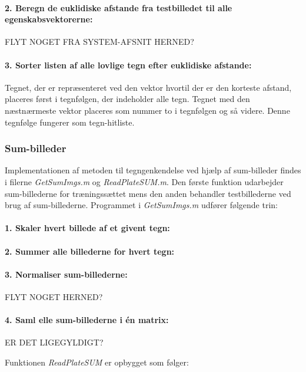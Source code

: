 \paragraph{2. Beregn de euklidiske afstande fra testbilledet til alle egenskabsvektorerne:} FLYT NOGET FRA SYSTEM-AFSNIT HERNED?

\paragraph{3. Sorter listen af alle lovlige tegn efter euklidiske afstande:} Tegnet, der er repræsenteret ved den vektor hvortil der er den korteste afstand, placeres først i tegnfølgen, der indeholder alle tegn. Tegnet med den næstnærmeste vektor placeres som nummer to i tegnfølgen og så videre. Denne tegnfølge fungerer som tegn-hitliste.

\subsubsection{Sum-billeder}

Implementationen af metoden til tegngenkendelse ved hjælp af sum-billeder findes i filerne \textit{GetSumImgs.m} og \textit{ReadPlateSUM.m}. Den første funktion udarbejder sum-billederne for træningssættet mens den anden behandler testbillederne ved brug af sum-billederne. Programmet i \textit{GetSumImgs.m} udfører følgende trin:

\paragraph{1. Skaler hvert billede af et givent tegn:}

\paragraph{2. Summer alle billederne for hvert tegn:}

\paragraph{3. Normaliser sum-billederne:} FLYT NOGET HERNED?

\paragraph{4. Saml elle sum-billederne i én matrix:} ER DET LIGEGYLDIGT?

Funktionen \textit{ReadPlateSUM} er opbygget som følger:

